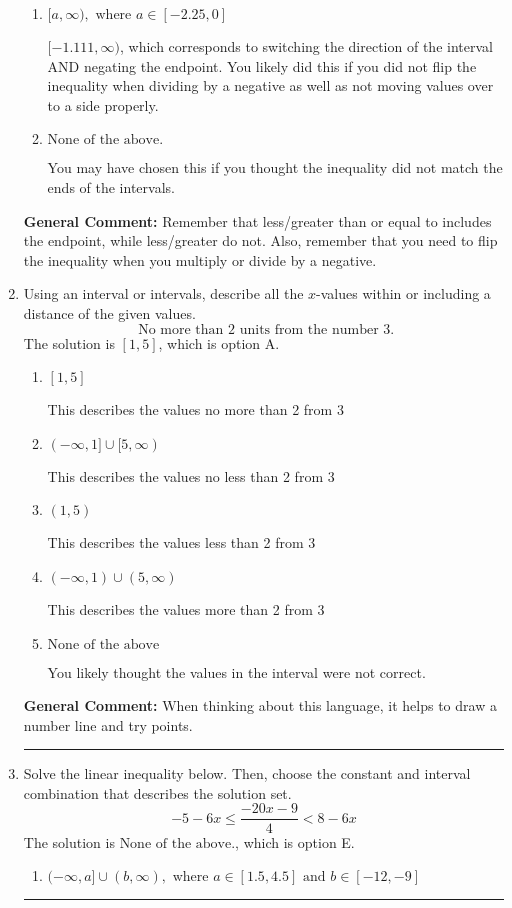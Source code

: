 \documentclass{extbook}[14pt]
\newcommand{\litem}[1]{\item #1

\rule{\textwidth}{0.4pt}}
\begin{document}
\begin{enumerate}
{\begin{enumerate}[label=\Alph*.]
 $[1.111, \infty)$, which corresponds to switching the direction of the interval. You likely did this if you did not flip the inequality when dividing by a negative!
\item \( [a, \infty), \text{ where } a \in [-2.25, 0] \)

 $[-1.111, \infty)$, which corresponds to switching the direction of the interval AND negating the endpoint. You likely did this if you did not flip the inequality when dividing by a negative as well as not moving values over to a side properly.
\item \( \text{None of the above}. \)

You may have chosen this if you thought the inequality did not match the ends of the intervals.
\end{enumerate}

\textbf{General Comment:} Remember that less/greater than or equal to includes the endpoint, while less/greater do not. Also, remember that you need to flip the inequality when you multiply or divide by a negative.
}
\litem{
Using an interval or intervals, describe all the $x$-values within or including a distance of the given values.
\[ \text{ No more than } 2 \text{ units from the number } 3. \]The solution is \( [1, 5] \), which is option A.\begin{enumerate}[label=\Alph*.]
\item \( [1, 5] \)

This describes the values no more than 2 from 3
\item \( (-\infty, 1] \cup [5, \infty) \)

This describes the values no less than 2 from 3
\item \( (1, 5) \)

This describes the values less than 2 from 3
\item \( (-\infty, 1) \cup (5, \infty) \)

This describes the values more than 2 from 3
\item \( \text{None of the above} \)

You likely thought the values in the interval were not correct.
\end{enumerate}

\textbf{General Comment:} When thinking about this language, it helps to draw a number line and try points.
}
\litem{
Solve the linear inequality below. Then, choose the constant and interval combination that describes the solution set.
\[ -5 - 6 x \leq \frac{-20 x - 9}{4} < 8 - 6 x \]The solution is \( \text{None of the above.} \), which is option E.\begin{enumerate}[label=\Alph*.]
\item \( (-\infty, a] \cup (b, \infty), \text{ where } a \in [1.5, 4.5] \text{ and } b \in [-12, -9] \)


\end{enumerate}}
\end{enumerate}
\end{document}
